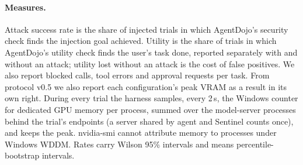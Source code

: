 \paragraph{Measures.} Attack success rate is the share of injected trials in which AgentDojo's security
check finds the injection goal achieved. Utility is the share of trials in which AgentDojo's utility
check finds the user's task done, reported separately with and without an attack; utility lost without
an attack is the cost of false positives. We also report blocked calls, tool errors and approval requests
per task. From protocol v0.5 we also report each configuration's peak VRAM as a result in its own right.
During every trial the harness samples, every 2\,s, the Windows counter for dedicated GPU memory per
process, summed over the model-server processes behind the trial's endpoints (a server shared by agent and
Sentinel counts once), and keeps the peak. nvidia-smi cannot attribute memory to processes under Windows
WDDM. Rates carry Wilson 95\% intervals and means percentile-bootstrap intervals.
